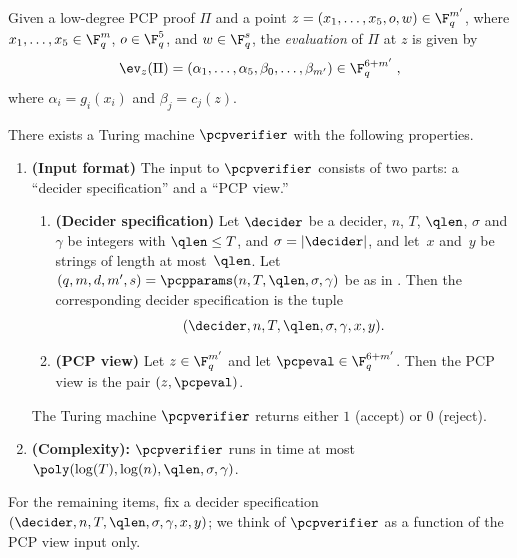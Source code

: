 \begin{definition}\label{def:pcp-eval}
  Given a low-degree PCP proof $\Pi$ and a point $z = (x_1, \dots, x_5, o, w)
  \in \F_q^{m'}$, where $x_1, \dots, x_5 \in \F_q^{m}$, $o \in \F_q^{5}$, and $w
  \in \F_q^{s}$, the \emph{evaluation} of $\Pi$ at $z$ is given by
  \[
    \ev_z(\Pi) = (\alpha_1, \dots, \alpha_5, \beta_0, \dots, \beta_{m'}) \in
    \F_{q}^{6 + m'}\;,
  \]
  where $\alpha_i = g_i(x_i)$ and $\beta_j = c_j(z)$.
\end{definition}

\begin{theorem}\label{thm:pcp-decider}
  There exists a Turing machine $\pcpverifier$ with the following properties.
  \begin{enumerate}
  \item \textbf{(Input format)} The input to $\pcpverifier$ consists of two parts:
    a ``decider specification'' and a ``PCP view.''
    \begin{enumerate}
    \item \textbf{(Decider specification)} Let $\decider$ be a decider, $n$,
      $T$, $\qlen$, $\sigma$ and $\gamma$ be integers with $\qlen \leq T$, and
      $\sigma = |\decider|$, and let~$x$ and~$y$ be strings of length at
      most~$\qlen$.
      Let $(q,m,d,m',s) = \pcpparams(n, T, \qlen,\sigma, \gamma)$ be as in
      .
      Then the corresponding decider specification is the tuple
      \[
        (\decider, n, T, \qlen, \sigma, \gamma, x, y).
      \]
    \item \textbf{(PCP view)} Let $z \in \F_{q}^{m'}$ and let $\pcpeval \in
      \F_q^{6 + m'}$.
      Then the PCP view is the pair $(z, \pcpeval)$.
    \end{enumerate}
    The Turing machine $\pcpverifier$ returns either $1$ (accept) or $0$
    (reject).
  \item
    \textbf{(Complexity):} 
$\pcpverifier$ runs in time at most~$\poly(\log(T), \log(n), \qlen, \sigma, \gamma)$.
        
  \end{enumerate}
  For the remaining items, fix a decider specification $(\decider, n, T, \qlen,
  \sigma, \gamma, x, y)$; we think of $\pcpverifier$ as a function of the PCP view
  input only.


\end{theorem}
